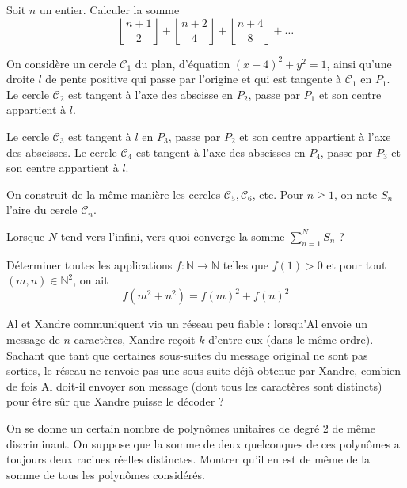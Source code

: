 \begin{exo}{}
Soit $n$ un entier. Calculer la somme
\[ \left\lfloor \frac{n+1}{2} \right\rfloor+ \left\lfloor \frac{n+2}{4}\right\rfloor + \left\lfloor \frac{n+4}{8} \right\rfloor + \dots \]
\end{exo}

\begin{exo}{}
On considère un cercle $ \mathcal{C}_{1}$ du plan, d'équation $(x-4)^{2}+y^{2}=1$, ainsi qu'une droite $l$ de pente positive qui passe par l'origine et qui est tangente à $ \mathcal{C}_{1}$ en $P_{1}$. Le cercle $ \mathcal{C}_{2}$ est tangent à l'axe des abscisse en $P_{2}$, passe par $P_{1}$ et son centre appartient à $l$.

Le cercle $ \mathcal{C}_{3}$ est tangent à $l$ en $P_{3}$, passe par $P_{2}$ et son centre appartient à l'axe des abscisses. Le cercle $ \mathcal{C}_{4}$ est tangent à l'axe des abscisses en $P_{4}$, passe par $P_{3}$ et son centre appartient à $l$.

On construit de la même manière les cercles $ \mathcal{C}_{5}, \mathcal{C}_{6}$, etc. Pour $n \geq 1$, on note $S_{n}$ l'aire du cercle $ \mathcal{C}_{n}$.

Lorsque $N$ tend vers l'infini, vers quoi converge la somme $\displaystyle{\sum_{n=1}^{N} S_{n}}$ ?
\end{exo}


\begin{exo}{}
Déterminer toutes les applications $f : \mathbb{N} \rightarrow \mathbb{N}$ telles que $f(1)>0$ et pour tout $(m,n) \in \mathbb{N}^{2}$, on ait
\[f(m^2+n^2) = f(m)^2+f(n)^2\]
\end{exo}

\begin{exo}{}Al et Xandre communiquent via un réseau peu fiable : lorsqu’Al envoie un message de $n$ caractères,
Xandre reçoit $k$ d’entre eux (dans le même ordre). Sachant que tant que certaines
sous-suites du message original ne sont pas sorties, le réseau ne renvoie pas une sous-suite déjà
obtenue par Xandre, combien de fois Al doit-il envoyer son message (dont tous les caractères sont
distincts) pour être sûr que Xandre puisse le décoder ?
\end{exo}

\begin{exo}{}
On se donne un certain nombre de polynômes unitaires de degré $2$ de même discriminant. On suppose que la somme de deux quelconques de ces polynômes a toujours deux racines réelles distinctes. Montrer qu'il en est de même de la somme de tous les polynômes considérés.
\end{exo}

